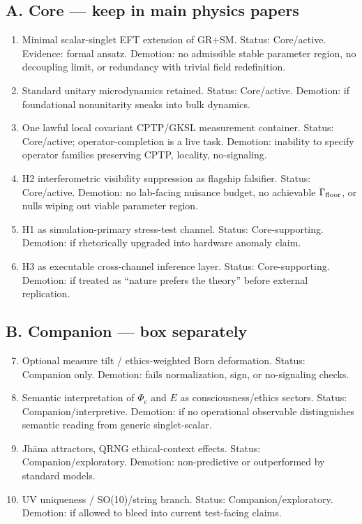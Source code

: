 \documentclass[reprint,amsmath,amssymb,aps,showkeys]{revtex4-2}
\newcommand{\Phic}{\Phi_{\mathrm{c}}}
\begin{document}
\subsection*{A. Core --- keep in main physics papers}
\begin{enumerate}
\item Minimal scalar-singlet EFT extension of GR+SM. Status: Core/active. Evidence: formal ansatz. Demotion: no admissible stable parameter region, no decoupling limit, or redundancy with trivial field redefinition.
\item Standard unitary microdynamics retained. Status: Core/active. Demotion: if foundational nonunitarity sneaks into bulk dynamics.
\item One lawful local covariant CPTP/GKSL measurement container. Status: Core/active; operator-completion is a live task. Demotion: inability to specify operator families preserving CPTP, locality, no-signaling.
\item H2 interferometric visibility suppression as flagship falsifier. Status: Core/active. Demotion: no lab-facing nuisance budget, no achievable $\Gamma_{\rm floor}$, or nulls wiping out viable parameter region.
\item H1 as simulation-primary stress-test channel. Status: Core-supporting. Demotion: if rhetorically upgraded into hardware anomaly claim.
\item H3 as executable cross-channel inference layer. Status: Core-supporting. Demotion: if treated as ``nature prefers the theory'' before external replication.
\end{enumerate}

\subsection*{B. Companion --- box separately}
\begin{enumerate}
\setcounter{enumi}{6}
\item Optional measure tilt / ethics-weighted Born deformation. Status: Companion only. Demotion: fails normalization, sign, or no-signaling checks.
\item Semantic interpretation of $\Phic$ and $E$ as consciousness/ethics sectors. Status: Companion/interpretive. Demotion: if no operational observable distinguishes semantic reading from generic singlet-scalar.
\item Jhāna attractors, QRNG ethical-context effects. Status: Companion/exploratory. Demotion: non-predictive or outperformed by standard models.
\item UV uniqueness / SO(10)/string branch. Status: Companion/exploratory. Demotion: if allowed to bleed into current test-facing claims.
\end{enumerate}
\end{document}
